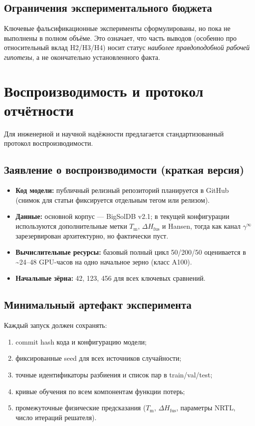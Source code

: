\documentclass[11pt]{article}
\begin{document}
\subsection{Ограничения экспериментального бюджета}

Ключевые фальсификационные эксперименты сформулированы, но пока не выполнены в полном объёме. Это означает, что часть выводов (особенно про относительный вклад H2/H3/H4) носит статус \textit{наиболее правдоподобной рабочей гипотезы}, а не окончательно установленного факта.

\section{Воспроизводимость и протокол отчётности}

Для инженерной и научной надёжности предлагается стандартизованный протокол воспроизводимости.

\subsection{Заявление о воспроизводимости (краткая версия)}

\begin{itemize}
  \item \textbf{Код модели:} публичный релизный репозиторий планируется в GitHub (снимок для статьи фиксируется отдельным тегом или релизом).
  \item \textbf{Данные:} основной корпус --- BigSolDB v2.1; в текущей конфигурации используются дополнительные метки $T_{\mathrm{m}}$, $\Delta H_{\mathrm{fus}}$ и Hansen, тогда как канал $\gamma^\infty$ зарезервирован архитектурно, но фактически пуст.
  \item \textbf{Вычислительные ресурсы:} базовый полный цикл 50/200/50 оценивается в \textasciitilde24--48 GPU-часов на одно начальное зерно (класс A100).
  \item \textbf{Начальные зёрна:} 42, 123, 456 для всех ключевых сравнений.
\end{itemize}

\subsection{Минимальный артефакт эксперимента}

Каждый запуск должен сохранять:
\begin{enumerate}
  \item commit hash кода и конфигурацию модели;
  \item фиксированные seed для всех источников случайности;
  \item точные идентификаторы разбиения и список пар в train/val/test;
  \item кривые обучения по всем компонентам функции потерь;
  \item промежуточные физические предсказания ($T_{\mathrm{m}}$, $\Delta H_{\mathrm{fus}}$, параметры NRTL, число итераций решателя).
\end{enumerate}
\end{document}

